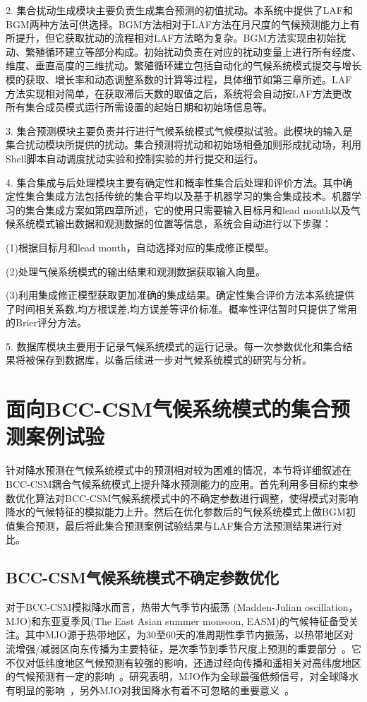 2. 集合扰动生成模块主要负责生成集合预测的初值扰动。本系统中提供了LAF和BGM两种方法可供选择。BGM方法相对于LAF方法在月尺度的气候预测能力上有所提升，但它获取扰动的流程相对LAF方法略为复杂。BGM方法实现由初始扰动、繁殖循环建立等部分构成。初始扰动负责在对应的扰动变量上进行所有经度、维度、垂直高度的三维扰动。繁殖循环建立包括自动化的气候系统模式提交与增长模的获取、增长率和动态调整系数的计算等过程，具体细节如第三章所述。LAF方法实现相对简单，在获取滞后天数的取值之后，系统将会自动按LAF方法更改所有集合成员模式运行所需设置的起始日期和初始场信息等。

3. 集合预测模块主要负责并行进行气候系统模式气候模拟试验。此模块的输入是集合扰动模块所提供的扰动。集合预测将扰动和初始场相叠加则形成扰动场，利用Shell脚本自动调度扰动实验和控制实验的并行提交和运行。

4. 集合集成与后处理模块主要有确定性和概率性集合后处理和评价方法。其中确定性集合集成方法包括传统的集合平均以及基于机器学习的集合集成技术。机器学习的集合集成方案如第四章所述，它的使用只需要输入目标月和lead month以及气候系统模式输出数据和观测数据的位置等信息，系统会自动进行以下步骤：

(1)根据目标月和lead month，自动选择对应的集成修正模型。

(2)处理气候系统模式的输出结果和观测数据获取输入向量。

(3)利用集成修正模型获取更加准确的集成结果。确定性集合评价方法本系统提供了时间相关系数,均方根误差,均方误差等评价标准。概率性评估暂时只提供了常用的Brier评分方法。

5. 数据库模块主要用于记录气候系统模式的运行记录。每一次参数优化和集合结果将被保存到数据库，以备后续进一步对气候系统模式的研究与分析。

\section{面向BCC-CSM气候系统模式的集合预测案例试验}
针对降水预测在气候系统模式中的预测相对较为困难的情况，本节将详细叙述在BCC-CSM耦合气候系统模式上提升降水预测能力的应用。首先利用多目标约束参数优化算法对BCC-CSM气候系统模式中的不确定参数进行调整，使得模式对影响降水的气候特征的模拟能力上升。然后在优化参数后的气候系统模式上做BGM初值集合预测，最后将此集合预测案例试验结果与LAF集合方法预测结果进行对比。
\subsection{BCC-CSM气候系统模式不确定参数优化}
对于BCC-CSM模拟降水而言，热带大气季节内振荡 (Madden-Julian oscillation，MJO)和东亚夏季风(The East Asian summer monsoon, EASM)的气候特征备受关注。其中MJO源于热带地区，为30至60天的准周期性季节内振荡，以热带地区对流增强/减弱区向东传播为主要特征，是次季节到季节尺度上预测的重要部分~\cite{梁萍2013mjo}。它不仅对低纬度地区气候预测有较强的影响，还通过经向传播和遥相关对高纬度地区的气候预测有一定的影响~\cite{任宏利2015mjo}。研究表明，MJO作为全球最强低频信号，对全球降水有明显的影响~\cite{mo1998tropical}，另外MJO对我国降水有着不可忽略的重要意义~\cite{白旭旭2011mjo,吴捷2018mjo}。

